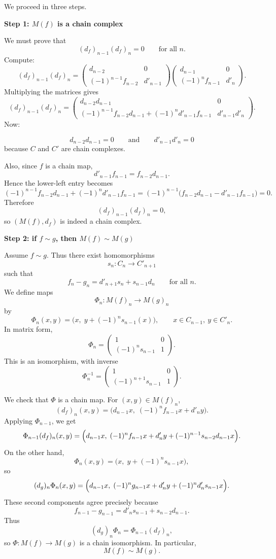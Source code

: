 \begin{solution}
We proceed in three steps.


\medskip
\noindent\textbf{Step 1: \(M(f)\) is a chain complex}\par
\smallskip


We must prove that
\[
(d_f)_{n-1}(d_f)_n=0
\qquad\text{for all }n.
\]
Compute:
\[
(d_f)_{n-1}(d_f)_n
=
\begin{pmatrix}
	d_{n-2} & 0\\
	(-1)^{n-1}f_{n-2} & d'_{n-1}
\end{pmatrix}
\begin{pmatrix}
	d_{n-1} & 0\\
	(-1)^n f_{n-1} & d'_n
\end{pmatrix}.
\]
Multiplying the matrices gives
\[
(d_f)_{n-1}(d_f)_n
=
\begin{pmatrix}
	d_{n-2}d_{n-1} & 0\\[1mm]
	(-1)^{n-1}f_{n-2}d_{n-1}+(-1)^n d'_{n-1}f_{n-1} & d'_{n-1}d'_n
\end{pmatrix}.
\]
Now:

\[
d_{n-2}d_{n-1}=0
\qquad\text{and}\qquad
d'_{n-1}d'_n=0
\]
because \(C\) and \(C'\) are chain complexes.

Also, since \(f\) is a chain map,
\[
d'_{n-1}f_{n-1}=f_{n-2}d_{n-1}.
\]
Hence the lower-left entry becomes
\[
(-1)^{n-1}f_{n-2}d_{n-1}+(-1)^n d'_{n-1}f_{n-1}
=
(-1)^{n-1}\bigl(f_{n-2}d_{n-1}-d'_{n-1}f_{n-1}\bigr)=0.
\]
Therefore
\[
(d_f)_{n-1}(d_f)_n=0,
\]
so \((M(f),d_f)\) is indeed a chain complex.


\medskip
\noindent\textbf{Step 2: if \(f\sim g\), then \(M(f)\sim M(g)\)}\par
\smallskip


Assume \(f\sim g\). Thus there exist homomorphisms
\[
s_n:C_n\to C'_{n+1}
\]
such that
\[
f_n-g_n=d'_{n+1}s_n+s_{n-1}d_n
\qquad\text{for all }n.
\]
We define maps
\[
\Phi_n:M(f)_n\to M(g)_n
\]
by
\[
\Phi_n(x,y)=\bigl(x,\; y+(-1)^n s_{n-1}(x)\bigr),
\qquad x\in C_{n-1},\ y\in C'_n.
\]
In matrix form,
\[
\Phi_n=
\begin{pmatrix}
	1 & 0\\
	(-1)^n s_{n-1} & 1
\end{pmatrix}.
\]
This is an isomorphism, with inverse
\[
\Phi_n^{-1}=
\begin{pmatrix}
	1 & 0\\
	(-1)^{n+1}s_{n-1} & 1
\end{pmatrix}.
\]

We check that \(\Phi\) is a chain map. For \((x,y)\in M(f)_n\),
\[
(d_f)_n(x,y)=\bigl(d_{n-1}x,\; (-1)^n f_{n-1}x+d'_n y\bigr).
\]
Applying \(\Phi_{n-1}\), we get
\[
\Phi_{n-1}(d_f)_n(x,y)
=
\Bigl(
d_{n-1}x,\;
(-1)^n f_{n-1}x+d'_n y+(-1)^{n-1}s_{n-2}d_{n-1}x
\Bigr).
\]
On the other hand,
\[
\Phi_n(x,y)=\bigl(x,\; y+(-1)^n s_{n-1}x\bigr),
\]
so
\[
(d_g)_n\Phi_n(x,y)
=
\Bigl(
d_{n-1}x,\;
(-1)^n g_{n-1}x+d'_n y+(-1)^n d'_n s_{n-1}x
\Bigr).
\]
These second components agree precisely because
\[
f_{n-1}-g_{n-1}=d'_n s_{n-1}+s_{n-2}d_{n-1}.
\]
Thus
\[
(d_g)_n\Phi_n=\Phi_{n-1}(d_f)_n,
\]
so \(\Phi:M(f)\to M(g)\) is a chain isomorphism. In particular,
\[
M(f)\sim M(g).
\]



\end{solution}
